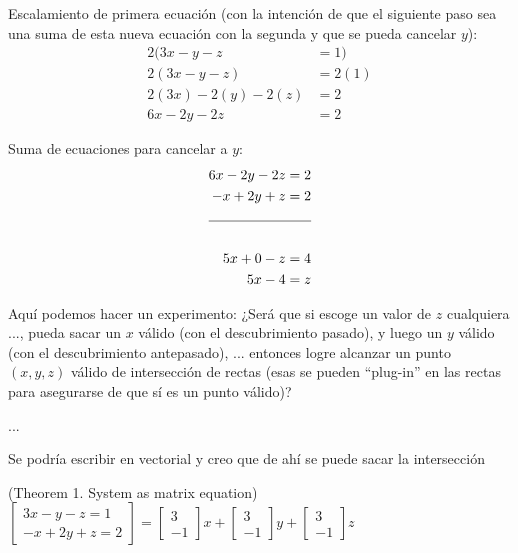 \documentclass[12pt,oneside]{book}
\begin{document}
Escalamiento de primera ecuación (con la intención de que el siguiente paso sea una suma de esta nueva ecuación con la segunda y que se pueda cancelar $y$):
\begin{align*}
  2(3x -  y - z &= 1) \\
  2(3x -  y - z) &= 2(1) \\
  2(3x) -  2(y) - 2(z) &= 2 \\
  6x -  2y - 2z &= 2
\end{align*}

Suma de ecuaciones para cancelar a $y$:
\begin{align*}
  6x -  2y - 2z &= 2 \\
  -x + 2y + z &= 2 \\
  \cline{1-2} \\
  5x + 0 - z &= 4 \\
  5x - 4 &= z
\end{align*}

Aquí podemos hacer un experimento:
¿Será que si escoge un valor de $z$ cualquiera $...$, pueda sacar un $x$ válido (con el descubrimiento pasado), y luego un $y$ válido (con el descubrimiento antepasado), $...$ entonces logre alcanzar un punto $(x, y, z)$ válido de intersección de rectas (esas se pueden ``plug-in'' en las rectas para asegurarse de que sí es un punto válido)?


...

Se podría escribir en vectorial y creo que de ahí se puede sacar la intersección

\def\theorem{1cm}
\begin{center}\vspace{\theorem}\big(Theorem 1. System as matrix equation\big)
  \large\(
    \begin{bmatrix}
      3x-y-z = 1 \\
      -x+2y+z = 2
    \end{bmatrix}
    = \begin{bmatrix} 3\\ -1 \end{bmatrix} x
    + \begin{bmatrix} 3\\ -1 \end{bmatrix} y
    + \begin{bmatrix} 3\\ -1 \end{bmatrix} z
    \)
\normalsize\end{center}







  \printbibliography[title={Bibliografía},heading=bibintoc]
\end{document}
